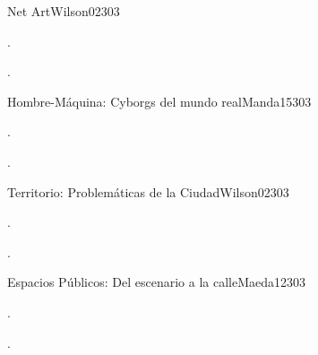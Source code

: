 \begin{syllabus}
\begin{unit}{Net Art}{}{Wilson02}{30}{3}
   \begin{topics}
      \item .
   \end{topics}

   \begin{learningoutcomes}
      \item . 
   \end{learningoutcomes}
\end{unit}

\begin{unit}{Hombre-Máquina: Cyborgs del mundo real}{}{Manda15}{30}{3}
   \begin{topics}
      \item . 
   \end{topics}

   \begin{learningoutcomes}
      \item . 
   \end{learningoutcomes}
\end{unit}

\begin{unit}{Territorio: Problemáticas de la Ciudad}{}{Wilson02}{30}{3}
   \begin{topics}
      \item .
   \end{topics}

   \begin{learningoutcomes}
      \item .
   \end{learningoutcomes}
\end{unit}

\begin{unit}{Espacios Públicos: Del escenario a la calle}{}{Maeda12}{30}{3}
   \begin{topics}
      \item . 
   \end{topics}

   \begin{learningoutcomes}
      \item .
   \end{learningoutcomes}
\end{unit}



\begin{coursebibliography}
\end{coursebibliography}
\end{syllabus}
